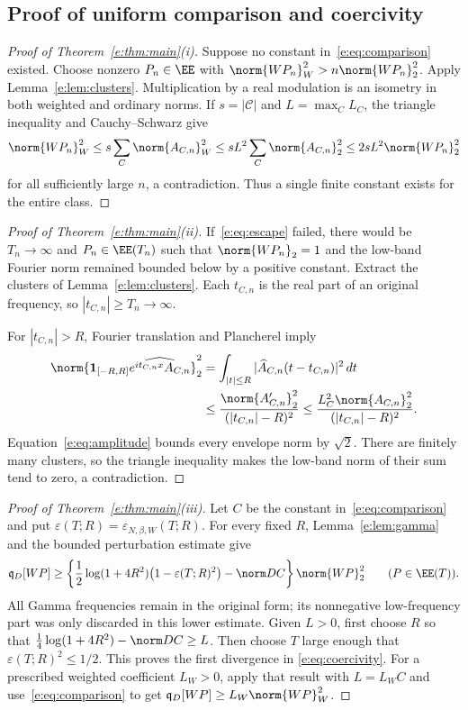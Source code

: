 \documentclass[11pt,a4paper]{article}
\numberwithin{equation}{section}
\theoremstyle{definition}\newtheorem{definition}[theorem]{Definition}
\theoremstyle{remark}\newtheorem{remark}[theorem]{Remark}
\newcommand{\qD}{\mathfrak q_D}\newcommand{\qth}{\mathfrak q_\theta}
\begin{document}
\subsection{Proof of uniform comparison and coercivity}\label{e:sec:proof}

\begin{proof}[Proof of Theorem~\ref{e:thm:main}\textup{(i)}]
Suppose no constant in~\eqref{e:eq:comparison} existed. Choose nonzero
$P_n\in\EE$ with $\norm{WP_n}_W^2>n\norm{WP_n}_2^2$. Apply
Lemma~\ref{e:lem:clusters}. Multiplication by a real modulation is an
isometry in both weighted and ordinary norms. If $s=|\mathcal C|$ and
$L=\max_C L_C$, the triangle inequality and Cauchy--Schwarz give
\[
 \norm{WP_n}_W^2\le s\sum_C\norm{A_{C,n}}_W^2
 \le sL^2\sum_C\norm{A_{C,n}}_2^2
 \le2sL^2\norm{WP_n}_2^2
\]
for all sufficiently large $n$, a contradiction. Thus a single finite
constant exists for the entire class.
\end{proof}

\begin{proof}[Proof of Theorem~\ref{e:thm:main}\textup{(ii)}]
If~\eqref{e:eq:escape} failed, there would be $T_n\to\infty$ and
$P_n\in\EE(T_n)$ such that $\norm{WP_n}_2=1$ and the low-band Fourier
norm remained bounded below by a positive constant. Extract the clusters
of Lemma~\ref{e:lem:clusters}. Each $t_{C,n}$ is the real part of an original
frequency, so $|t_{C,n}|\ge T_n\to\infty$.

For $|t_{C,n}|>R$, Fourier translation and Plancherel imply
\begin{align}\label{e:eq:low-band}
 \norm{\mathbf1_{[-R,R]}
 \widehat{e^{it_{C,n}x}A_{C,n}}}_2^2
 &=\int_{|t|\le R}|\widehat A_{C,n}(t-t_{C,n})|^2\,dt\notag\\
 &\le\frac{\norm{A_{C,n}'}_2^2}{(|t_{C,n}|-R)^2}
 \le\frac{L_C^2\norm{A_{C,n}}_2^2}{(|t_{C,n}|-R)^2}.
\end{align}
Equation~\eqref{e:eq:amplitude} bounds every envelope norm by $\sqrt2$.
There are finitely many clusters, so the triangle inequality makes the
low-band norm of their sum tend to zero, a contradiction.
\end{proof}

\begin{proof}[Proof of Theorem~\ref{e:thm:main}\textup{(iii)}]
Let $C$ be the constant in~\eqref{e:eq:comparison} and put
$\varepsilon(T;R)=\varepsilon_{N,\beta,W}(T;R)$. For every fixed $R$,
Lemma~\ref{e:lem:gamma} and the bounded perturbation estimate give
\begin{equation}\label{e:eq:master-lower}
 \qD[WP]\ge\left\{
 \frac12\log(1+4R^2)\bigl(1-\varepsilon(T;R)^2\bigr)
 -\norm D C\right\}\norm{WP}_2^2
 \qquad(P\in\EE(T)).
\end{equation}
All Gamma frequencies remain in the original form; its nonnegative
low-frequency part was only discarded in this lower estimate. Given
$L>0$, first choose $R$ so that
$\tfrac14\log(1+4R^2)-\norm D C\ge L$. Then choose $T$ large enough
that $\varepsilon(T;R)^2\le1/2$. This proves the first divergence in
\eqref{e:eq:coercivity}. For a prescribed weighted coefficient $L_W>0$,
apply that result with $L=L_W C$ and use~\eqref{e:eq:comparison} to get
$\qD[WP]\ge L_W\norm{WP}_W^2$.
\end{proof}
\end{document}
